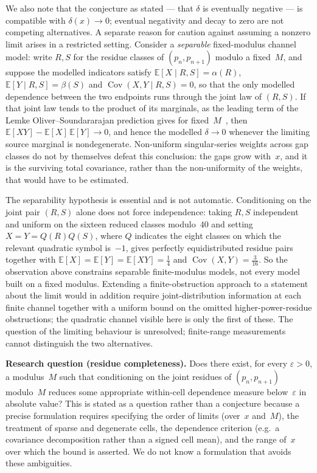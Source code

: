 \documentclass[11pt,reqno]{amsart}
\theoremstyle{plain}
\theoremstyle{definition}
\newcommand{\E}{\mathbb{E}}
\begin{document}
We also note that the conjecture as stated --- that $\delta$ is eventually
negative --- is compatible with $\delta(x) \to 0$; eventual negativity and
decay to zero are not competing alternatives. A separate
reason for caution against assuming a nonzero limit arises in a restricted setting.
Consider a \emph{separable} fixed-modulus channel model: write $R, S$ for the
residue classes of $(p_n, p_{n+1})$ modulo a fixed~$M$, and suppose the
modelled indicators satisfy $\E[X \mid R,S] = \alpha(R)$,
$\E[Y \mid R,S] = \beta(S)$ and $\operatorname{Cov}(X, Y \mid R,S) = 0$, so
that the only modelled dependence between the two endpoints runs through the
joint law of $(R,S)$. If that joint law tends to the product of its
marginals, as the leading term of the Lemke Oliver--Soundararajan prediction
gives for fixed~$M$~\cite{LOS2016}, then
$\E[XY] - \E[X]\,\E[Y] \to 0$, and hence the modelled $\delta \to 0$ whenever
the limiting source marginal is nondegenerate. Non-uniform singular-series
weights across gap classes do not by themselves defeat this conclusion: the
gaps grow with~$x$, and it is the surviving total covariance, rather than the
non-uniformity of the weights, that would have to be estimated.

The separability hypothesis is essential and is not automatic. Conditioning
on the joint pair $(R,S)$ alone does not force independence: taking $R,S$
independent and uniform on the sixteen reduced classes modulo~$40$ and setting
$X = Y = Q(R)Q(S)$, where $Q$ indicates the eight classes on which the
relevant quadratic symbol is~$-1$, gives perfectly equidistributed residue
pairs together with $\E[X] = \E[Y] = \E[XY] = \tfrac14$ and
$\operatorname{Cov}(X,Y) = \tfrac{3}{16}$. So the observation above constrains
separable finite-modulus models, not every model built on a fixed modulus.
Extending a finite-obstruction approach to a statement about the limit would
in addition require joint-distribution information at each finite channel
together with a uniform bound on the omitted higher-power-residue
obstructions; the quadratic channel visible here is only the first of these.
The question of the limiting behaviour is unresolved; finite-range
measurements cannot distinguish the two alternatives.

\textbf{Research question (residue completeness).}
Does there exist, for every $\varepsilon > 0$, a modulus~$M$ such that
conditioning on the joint residues of $(p_n, p_{n+1})$ modulo~$M$ reduces
some appropriate within-cell dependence measure below~$\varepsilon$ in
absolute value? This is stated as a question rather than a conjecture because
a precise formulation requires specifying the order of limits (over~$x$
and~$M$), the treatment of sparse and degenerate cells, the dependence
criterion (e.g.\ a covariance decomposition rather than a signed cell mean),
and the range of~$x$ over which the bound is asserted. We do not know a
formulation that avoids these ambiguities.
\end{document}
